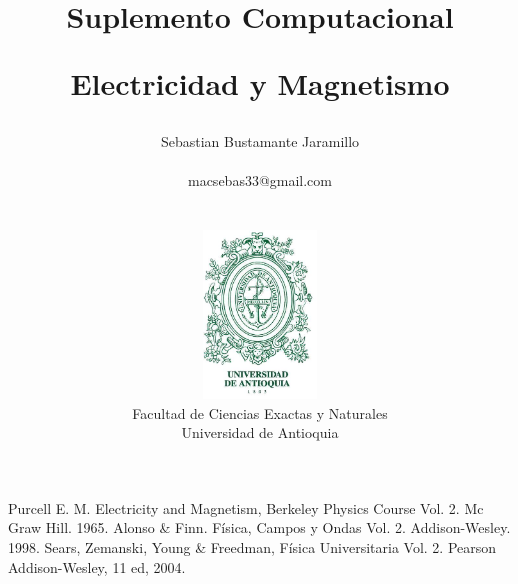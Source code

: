\documentclass[12pt]{book}
\begin{document}
\title{Suplemento Computacional \\
\begin{Huge}
\textbf{Electricidad y Magnetismo}
\end{Huge}}
\author{ Sebastian Bustamante Jaramillo\\ \begin{small}
macsebas33@gmail.com
\end{small} \\ \vspace{5cm} \\
\includegraphics[width=3cm]{pictures/UdeA_Shield} \\
Facultad de Ciencias Exactas y Naturales \\ 
Universidad de Antioquia }
\date{}
\maketitle



\newpage{\pagestyle{empty}\cleardoublepage}  

\tableofcontents
\newpage{\pagestyle{empty}\cleardoublepage}  














\begin{thebibliography}{}
 Purcell E. M. Electricity and Magnetism, Berkeley 
Physics Course Vol. 2. Mc Graw Hill. 1965. 
 Alonso \& Finn. Física, Campos y Ondas Vol. 2. Addison-Wesley. 
1998.
 Sears, Zemanski, Young \& Freedman, Física Universitaria Vol. 2. 
Pearson Addison-Wesley, 11 ed, 2004.
\end{thebibliography}
\end{document}
